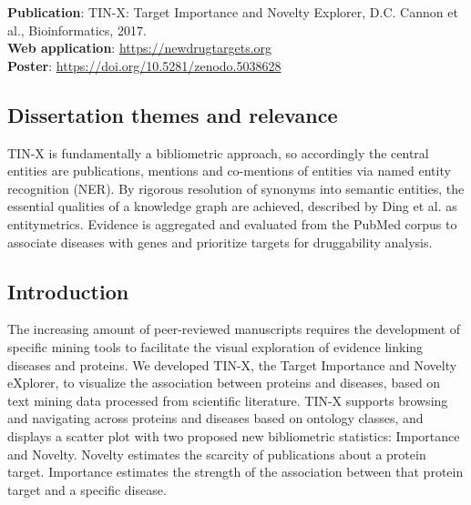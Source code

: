 \textbf{Publication}: TIN-X: Target Importance and Novelty Explorer, D.C. Cannon et al., Bioinformatics, 2017\cite{Cannon2017-af}.\\
\textbf{Web application}: \href{https://newdrugtargets.org}{https://newdrugtargets.org}\\
\textbf{Poster}: \href{https://doi.org/10.5281/zenodo.5038628}{https://doi.org/10.5281/zenodo.5038628}

\subsection{Dissertation themes and relevance}

TIN-X is fundamentally a bibliometric approach, so accordingly the central entities are publications, mentions and co-mentions of entities via named entity recognition (NER). By rigorous resolution of synonyms into semantic entities, the essential qualities of a knowledge graph are achieved, described by Ding et al. as entitymetrics\cite{Ding2013-ua}. Evidence is aggregated and evaluated from the PubMed corpus to associate diseases with genes and prioritize targets for druggability analysis.

\subsection{Introduction}

The increasing amount of peer-reviewed manuscripts requires the development of specific mining tools to facilitate the visual exploration of evidence linking diseases and proteins. We developed TIN-X, the Target Importance and Novelty eXplorer, to visualize the association between proteins and diseases, based on text mining data processed from scientific literature. TIN-X supports browsing and navigating across proteins and diseases based on ontology classes, and displays a scatter plot with two proposed new bibliometric statistics: Importance and Novelty. Novelty estimates the scarcity of publications about a protein target. Importance estimates the strength of the association between that protein target and a specific disease.

